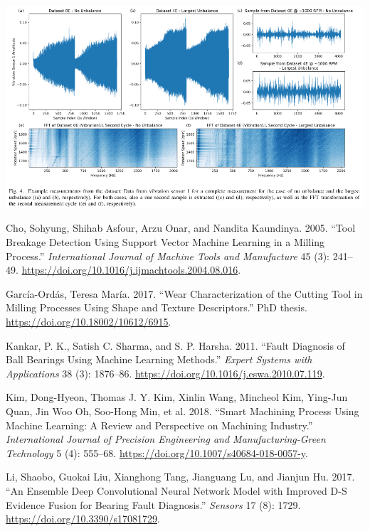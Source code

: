 \documentclass[
  letterpaper,
  DIV=11,
  numbers=noendperiod]{scrartcl}
\newlength{\cslhangindent}
\newlength{\cslentryspacingunit} %
\newenvironment{CSLReferences}[2] %
 {%
  \setlength{\parindent}{0pt}
  \ifodd #1
  \let\oldpar\par
  \def\par{\hangindent=\cslhangindent\oldpar}
  \fi
  \setlength{\parskip}{#2\cslentryspacingunit}
 }%
 {}
\begin{document}
\includegraphics{img/2023-01-29-17-23-08.png}

\hypertarget{refs}{}
\begin{CSLReferences}{1}{0}
\leavevmode{}%
Cho, Sohyung, Shihab Asfour, Arzu Onar, and Nandita Kaundinya. 2005.
{``Tool Breakage Detection Using Support Vector Machine Learning in a
Milling Process.''} \emph{International Journal of Machine Tools and
Manufacture} 45 (3): 241--49.
\url{https://doi.org/10.1016/j.ijmachtools.2004.08.016}.

\leavevmode{}%
García-Ordás, Teresa María. 2017. {``Wear Characterization of the
Cutting Tool in Milling Processes Using Shape and Texture
Descriptors.''} PhD thesis. \url{https://doi.org/10.18002/10612/6915}.

\leavevmode{}%
Kankar, P. K., Satish C. Sharma, and S. P. Harsha. 2011. {``Fault
Diagnosis of Ball Bearings Using Machine Learning Methods.''}
\emph{Expert Systems with Applications} 38 (3): 1876--86.
\url{https://doi.org/10.1016/j.eswa.2010.07.119}.

\leavevmode{}%
Kim, Dong-Hyeon, Thomas J. Y. Kim, Xinlin Wang, Mincheol Kim, Ying-Jun
Quan, Jin Woo Oh, Soo-Hong Min, et al. 2018. {``Smart Machining Process
Using Machine Learning: A Review and Perspective on Machining
Industry.''} \emph{International Journal of Precision Engineering and
Manufacturing-Green Technology} 5 (4): 555--68.
\url{https://doi.org/10.1007/s40684-018-0057-y}.

\leavevmode{}%
Li, Shaobo, Guokai Liu, Xianghong Tang, Jianguang Lu, and Jianjun Hu.
2017. {``An {Ensemble} {Deep} {Convolutional} {Neural} {Network} {Model}
with {Improved} {D}-{S} {Evidence} {Fusion} for {Bearing} {Fault}
{Diagnosis}.''} \emph{Sensors} 17 (8): 1729.
\url{https://doi.org/10.3390/s17081729}.


\end{CSLReferences}
\end{document}
